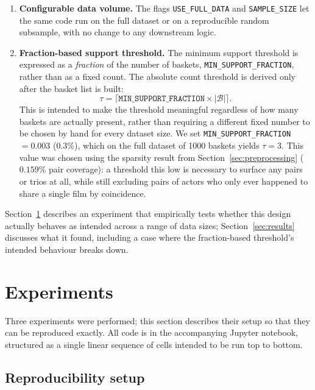 \documentclass[11pt,a4paper]{article}
\begin{document}
\begin{enumerate}
    \item \textbf{Configurable data volume.} The flags \texttt{USE\_FULL\_DATA} and
    \texttt{SAMPLE\_SIZE} let the same code run on the full dataset or on a
    reproducible random subsample, with no change to any downstream logic.
    \item \textbf{Fraction-based support threshold.} The minimum support
    threshold is expressed as a \emph{fraction} of the number of baskets,
    \texttt{MIN\_SUPPORT\_FRACTION}, rather than as a fixed count. The
    absolute count threshold is derived only after the basket list is built:
    \[
        \tau = \lceil \texttt{MIN\_SUPPORT\_FRACTION} \times |\mathcal{B}| \rceil .
    \]
    This is intended to make the threshold meaningful regardless of how many
    baskets are actually present, rather than requiring a different fixed
    number to be chosen by hand for every dataset size. We set
    \texttt{MIN\_SUPPORT\_FRACTION} $= 0.003$ (0.3\%), which on the full
    dataset of 1000 baskets yields $\tau = 3$. This value was chosen using the
    sparsity result from Section~\ref{sec:preprocessing} ($0.159\%$ pair
    coverage): a threshold this low is necessary to surface any pairs or
    trios at all, while still excluding pairs of actors who only ever happened
    to share a single film by coincidence.
\end{enumerate}

Section~\ref{sec:experiments} describes an experiment that empirically tests
whether this design actually behaves as intended across a range of data
sizes; Section~\ref{sec:results} discusses what it found, including a case
where the fraction-based threshold's intended behaviour breaks down.

\section{Experiments}
\label{sec:experiments}

Three experiments were performed; this section describes their setup so that
they can be reproduced exactly. All code is in the accompanying Jupyter
notebook, structured as a single linear sequence of cells intended to be run
top to bottom.

\subsection{Reproducibility setup}
\end{document}
